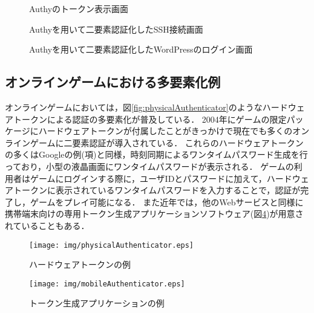 \begin{figure}[ht]
  \begin{center}
  \end{center}
  \caption{Authyのトークン表示画面}
  \label{fig:authyiPhone}
\end{figure}

\begin{figure}[ht]
  \begin{center}
  \end{center}
  \caption{Authyを用いて二要素認証化したSSH接続画面}
  \label{fig:authySSH}
\end{figure}

\begin{figure}[ht]
  \begin{center}
  \end{center}
  \caption{Authyを用いて二要素認証化したWordPressのログイン画面}
  \label{fig:authyWordpress}
\end{figure}

\subsection{オンラインゲームにおける多要素化例}
オンラインゲームにおいては，図\ref{fig:physicalAuthenticator}のようなハードウェアトークンによる認証の多要素化が普及している\cite{DBLP:journals/corr/CristofaroDFN13}．
2004年にゲームの限定パッケージにハードウェアトークンが付属した\cite{Yamane:2011:SOG:2021672.2021743}ことがきっかけで現在でも多くのオンラインゲームに二要素認証が導入されている．
これらのハードウェアトークンの多くはGoogleの例(\label{subsec:google2F}項)と同様，時刻同期によるワンタイムパスワード生成を行っており，小型の液晶画面にワンタイムパスワードが表示される．
ゲームの利用者はゲームにログインする際に，ユーザIDとパスワードに加えて，ハードウェアトークンに表示されているワンタイムパスワードを入力することで，認証が完了し，ゲームをプレイ可能になる．
また近年では，他のWebサービスと同様に携帯端末向けの専用トークン生成アプリケーションソフトウェア(図\ref{fig:mobileAuthenticator})が用意されていることもある．

\begin{figure}[ht]
  \begin{minipage}{0.5\hsize}
    \begin{center}
      \texttt{[image: img/physicalAuthenticator.eps]}
    \end{center}
    \caption{ハードウェアトークンの例}
    \label{fig:physicalAuthenticator}
  \end{minipage}
  \begin{minipage}{0.5\hsize}
    \begin{center}
      \texttt{[image: img/mobileAuthenticator.eps]}
    \end{center}
    \caption{トークン生成アプリケーションの例}
    \label{fig:mobileAuthenticator}
  \end{minipage}
\end{figure}


\newpage
